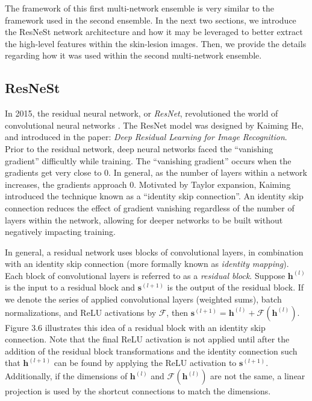 \documentclass [MAS] {uclathes}
\begin{document}
The framework of this first multi-network ensemble is very similar to the framework used in the second ensemble. In the next two sections, we introduce the ResNeSt network architecture and how it may be leveraged to better extract the high-level features within the skin-lesion images. Then, we provide the details regarding how it was used within the second multi-network ensemble.

\subsection{ResNeSt}

In 2015, the residual neural network, or \textit{ResNet}, revolutioned the world of convolutional neural networks \cite{resnet}. The ResNet model was designed by Kaiming He, and introduced in the paper: \textit{Deep Residual Learning for Image Recognition}. Prior to the residual network, deep neural networks faced the ``vanishing gradient'' difficultly while training. The ``vanishing gradient'' occurs when the gradients get very close to 0. In general, as the number of layers within a network increases, the gradients approach 0. Motivated by Taylor expansion, Kaiming introduced the technique known as a ``identity skip connection''. An identity skip connection reduces the effect of gradient vanishing regardless of the number of layers within the network, allowing for deeper networks to be built without negatively impacting training. 

In general, a residual network uses blocks of convolutional layers, in combination with an identity skip connection (more formally known as \textit{identity mapping}). Each block of convolutional layers is referred to as a \textit{residual block}. Suppose $\mathbf{h}^{(l)}$ is the input to a residual block and $\mathbf{s}^{(l+1)}$ is the output of the residual block. If we denote the series of applied convolutional layers (weighted sums), batch normalizations, and ReLU activations by $\mathcal{F}$, then $\mathbf{s}^{(l+1)} = \mathbf{h}^{(l)} + \mathcal{F}(\mathbf{h}^{(l)})$. Figure 3.6 illustrates this idea of a residual block with an identity skip connection. Note that the final ReLU activation is not applied until after the addition of the residual block transformations and the identity connection such that $\mathbf{h}^{(l+1)}$ can be found by applying the ReLU activation to $\mathbf{s}^{(l+1)}$. Additionally, if the dimensions of $\mathbf{h}^{(l)}$ and $\mathcal{F}(\mathbf{h}^{(l)})$ are not the same, a linear projection is used by the shortcut connections to match the dimensions.
\end{document}
